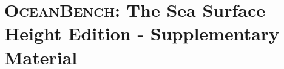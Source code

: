 \documentclass{article}
\begin{document}
\newpage
\appendix
\section*{\textsc{OceanBench}: The Sea Surface Height Edition - Supplementary Material}

\newpage

\newpage

\newpage

\newpage

\newpage

\newpage

% 
\newpage

\end{document}
